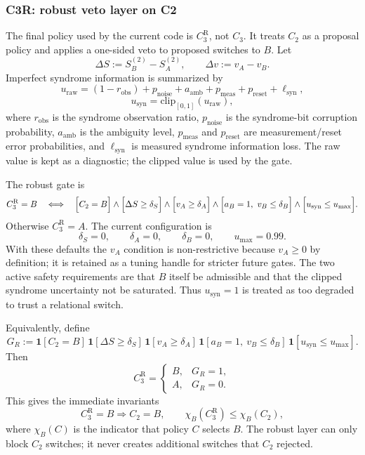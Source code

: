 \documentclass[11pt,a4paper]{article}
\theoremstyle{definition}
\theoremstyle{remark}
\begin{document}
\subsubsection*{C3R: robust veto layer on C2}

The final policy used by the current code is $C_3^{\mathrm{R}}$, not $C_3$.  It treats
$C_2$ as a proposal policy and applies a one-sided veto to proposed switches to $B$.
Let
\[
\Delta S:=S_B^{(2)}-S_A^{(2)},
\qquad
\Delta v:=v_A-v_B.
\]
Imperfect syndrome information is summarized by
\[
u_{\mathrm{raw}}
=
(1-r_{\mathrm{obs}})
+p_{\mathrm{noise}}
+a_{\mathrm{amb}}
+p_{\mathrm{meas}}
+p_{\mathrm{reset}}
+\ell_{\mathrm{syn}},
\]
\[
u_{\mathrm{syn}}
=
\mathrm{clip}_{[0,1]}(u_{\mathrm{raw}}),
\]
where $r_{\mathrm{obs}}$ is the syndrome observation ratio, $p_{\mathrm{noise}}$ is
the syndrome-bit corruption probability, $a_{\mathrm{amb}}$ is the ambiguity level,
$p_{\mathrm{meas}}$ and $p_{\mathrm{reset}}$ are measurement/reset error probabilities,
and $\ell_{\mathrm{syn}}$ is measured syndrome information loss.  The raw value is
kept as a diagnostic; the clipped value is used by the gate.

The robust gate is
\[
C_3^{\mathrm{R}}=B
\quad\Longleftrightarrow\quad
\Bigl[C_2=B\Bigr]
\wedge
\Bigl[\Delta S\ge\delta_S\Bigr]
\wedge
\Bigl[v_A\ge\delta_A\Bigr]
\wedge
\Bigl[a_B=1,\ v_B\le\delta_B\Bigr]
\wedge
\Bigl[u_{\mathrm{syn}}\le u_{\max}\Bigr].
\]
Otherwise $C_3^{\mathrm{R}}=A$.  The current configuration is
\[
\delta_S=0,\qquad
\delta_A=0,\qquad
\delta_B=0,\qquad
u_{\max}=0.99.
\]
With these defaults the $v_A$ condition is non-restrictive because $v_A\ge0$ by
definition; it is retained as a tuning handle for stricter future gates.  The two
active safety requirements are that $B$ itself be admissible and that the clipped
syndrome uncertainty not be saturated.  Thus $u_{\mathrm{syn}}=1$ is treated as too
degraded to trust a relational switch.

Equivalently, define
\[
G_R
:=
\mathbf{1}[C_2=B]\,
\mathbf{1}[\Delta S\ge\delta_S]\,
\mathbf{1}[v_A\ge\delta_A]\,
\mathbf{1}[a_B=1,\ v_B\le\delta_B]\,
\mathbf{1}[u_{\mathrm{syn}}\le u_{\max}].
\]
Then
\[
C_3^{\mathrm{R}}
=
\begin{cases}
B, & G_R=1,\\
A, & G_R=0.
\end{cases}
\]
This gives the immediate invariants
\[
C_3^{\mathrm{R}}=B \Longrightarrow C_2=B,
\qquad
\chi_B(C_3^{\mathrm{R}})\le \chi_B(C_2),
\]
where $\chi_B(C)$ is the indicator that policy $C$ selects $B$.  The robust layer can
only block $C_2$ switches; it never creates additional switches that $C_2$ rejected.
\end{document}
